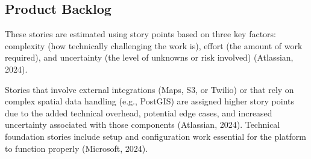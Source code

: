 \documentclass[12pt,a4paper]{article}
\begin{document}
\subsection{Product Backlog}

These stories are estimated using story points based on three key factors: complexity (how technically challenging the work is), effort (the amount of work required), and uncertainty (the level of unknowns or risk involved) (Atlassian, 2024).

Stories that involve external integrations (Maps, S3, or Twilio) or that rely on complex spatial data handling (e.g., PostGIS) are assigned higher story points due to the added technical overhead, potential edge cases, and increased uncertainty associated with those components (Atlassian, 2024). Technical foundation stories include setup and configuration work essential for the platform to function properly (Microsoft, 2024).
\end{document}
